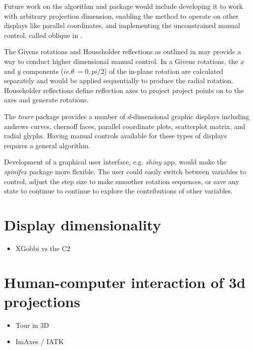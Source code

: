 \documentclass{monashthesis}
\begin{document}
Future work on the algorithm and package would include developing it to work with arbitrary projection dimension, enabling the method to operate on other displays like parallel coordinates, and implementing the unconstrained manual control, called oblique in \textcite{cook_manual_1997}.

The Givens rotations and Householder reflections as outlined in \textcite{buja_computational_2005} may provide a way to conduct higher dimensional manual control. In a Givens rotations, the \(x\) and \(y\) components (\(ie. \theta~= 0,pi/2\)) of the in-plane rotation are calculated separately and would be applied sequentially to produce the radial rotation. Householder reflections define reflection axes to project project points on to the axes and generate rotations.

The \emph{tourr} package provides a number of \(d\)-dimensional graphic displays including andrews curves, chernoff faces, parallel coordinate plots, scatterplot matrix, and radial glyphs. Having manual controls available for these types of displays requires a general algorithm.

Development of a graphical user interface, e.g. \emph{shiny} app, would make the \emph{spinifex} package more flexible. The user could easily switch between variables to control, adjust the step size to make smoother rotation sequences, or save any state to continue to continue to explore the contributions of other variables.

\hypertarget{ch:disp_dim}{%
\chapter{Display dimensionality}\label{ch:disp_dim}}

\begin{itemize}
\tightlist
\item
  XGobbi vs the C2
\end{itemize}

\hypertarget{ch:hci_3dproj}{%
\chapter{Human-computer interaction of 3d projections}\label{ch:hci_3dproj}}

\begin{itemize}
\tightlist
\item
  Tour in 3D
\item
  ImAxes / IATK
\end{itemize}

\printbibliography[heading=bibintoc]
\end{document}
